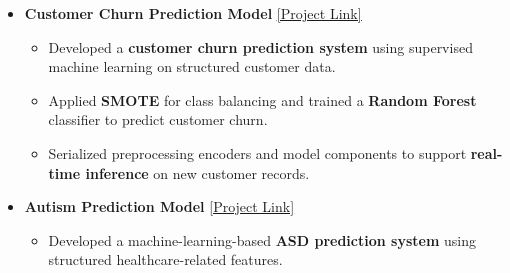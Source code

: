\documentclass[a4paper,10pt]{article}
\newcommand{\isep}{-2 pt}
\begin{document}
\begin{itemize}
\begin{itemize}
        \begin{itemize}\itemsep \isep

            \item Implemented a \textbf{Deep Convolutional Generative Adversarial Network (DCGAN)} for generating handwritten digit images.

            \item Developed separate \textbf{generator and discriminator architectures} using TensorFlow and Keras.

            \item Trained the model on the \textbf{MNIST dataset} and evaluated progressive image synthesis to generate realistic digit samples.

        \end{itemize}


        \item \textbf{Customer Churn Prediction Model}
        \underline{\href{https://github.com/devvrat-hans/Customer-Churn-Prediction-Model/}{[Project Link]}}
        \\[-0.5cm]

        \begin{itemize}\itemsep \isep

            \item Developed a \textbf{customer churn prediction system} using supervised machine learning on structured customer data.

            \item Applied \textbf{SMOTE} for class balancing and trained a \textbf{Random Forest} classifier to predict customer churn.

            \item Serialized preprocessing encoders and model components to support \textbf{real-time inference} on new customer records.

        \end{itemize}


        \item \textbf{Autism Prediction Model}
        \underline{\href{https://github.com/devvrat-hans/Autism-Prediction-Model/}{[Project Link]}}
        \\[-0.5cm]

        \begin{itemize}\itemsep \isep

            \item Developed a machine-learning-based \textbf{ASD prediction system} using structured healthcare-related features.


\end{itemize}
\end{itemize}
\end{itemize}
\end{document}
